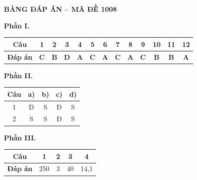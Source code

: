 
\vspace{0.3cm}
\noindent\begin{minipage}{\linewidth}
\begin{center}{\large\bfseries\color{red!80!black} BẢNG ĐÁP ÁN -- MÃ ĐỀ 1008}\end{center}
\noindent\textbf{Phần I.}\par\smallskip
\begin{center}\begin{tabular}{|c|c|c|c|c|c|c|c|c|c|c|c|c|}\hline
\textbf{Câu} & 1 & 2 & 3 & 4 & 5 & 6 & 7 & 8 & 9 & 10 & 11 & 12 \\ \hline
\textbf{Đáp án} & \textbf{C} & \textbf{B} & \textbf{D} & \textbf{A} & \textbf{C} & \textbf{A} & \textbf{C} & \textbf{A} & \textbf{C} & \textbf{B} & \textbf{B} & \textbf{A} \\ \hline
\end{tabular}\end{center}
\noindent\textbf{Phần II.}\par\smallskip
\begin{center}\begin{tabular}{|c|c|c|c|c|}\hline
\textbf{Câu} & \textbf{a)} & \textbf{b)} & \textbf{c)} & \textbf{d)} \\ \hline
1 & Đ & S & Đ & S \\ \hline
2 & S & S & Đ & S \\ \hline
\end{tabular}\end{center}
\noindent\textbf{Phần III.}\par\smallskip
\begin{center}\begin{tabular}{|c|c|c|c|c|}\hline
\textbf{Câu} & 1 & 2 & 3 & 4 \\ \hline
\textbf{Đáp án} & 250 & 3 & 40 & 14,1 \\ \hline
\end{tabular}\end{center}
\end{minipage}
